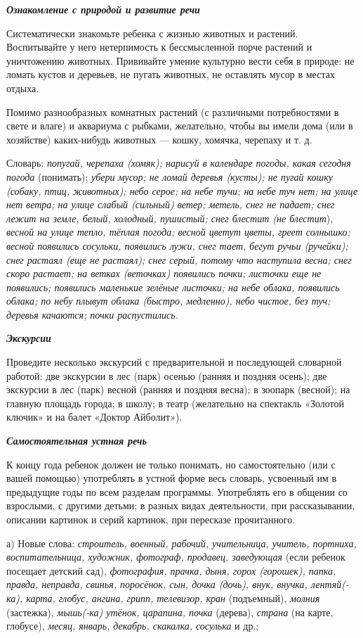 \documentclass[a5paper]{book}
\renewcommand{\emph}[1]{\textit{#1}}
\begin{document}
\emph{\textbf{Ознакомление с природой и развитие речи}}

Систематически знакомьте ребенка с жизнью животных и растений.
Воспитывайте у него нетерпимость к бессмысленной порче растений и
уничтожению животных. Прививайте умение культурно вести себя в природе:
не ломать кустов и деревьев, не пугать животных, не оставлять мусор в
местах отдыха.

Помимо разнообразных комнатных растений (с различными потребностями в
свете и влаге) и аквариума с рыбками, желательно, чтобы вы имели дома
(или в хозяйстве) каких-нибудь животных --- кошку, хомячка, черепаху и
т. д.

Словарь: \emph{попугай, черепаха (хомяк); нарисуй в календаре погоды,
какая сегодня погода} (понимать); \emph{убери мусор; не ломай деревья
(кусты); не пугай кошку (собаку, птиц, животных); небо серое; на небе
тучи; на небе туч нет; на улице нет ветра; на улице слабый (сильный)
ветер; метель, снег не падает; снег лежит на земле, белый, холодный,
пушистый; снег блестит (не блестит}), \emph{весной на улице тепло,
тёплая погода; весной цветут цветы, греет солнышко; весной появились
сосульки, появились лужи, снег тает, бегут ручьи (ручейки); снег растаял
(еще не растаял); снег серый, потому что наступила весна; снег скоро
растает; на ветках (веточках) появились почки; листочки еще не
появились; появились маленькие зелёные листочки; на небе облака,
появились облака; по небу плывут облака (быстро, медленно), небо чистое,
без туч; деревья качаются; почки распустились.}

\emph{\textbf{Экскурсии}}

Проведите несколько экскурсий с предварительной и последующей словарной
работой: две экскурсии в лес (парк) осенью (ранняя и поздняя осень); две
экскурсии в лес (парк) весной (ранняя и поздняя весна); в зоопарк
(весной); на главную площадь города; в школу; в театр (желательно на
спектакль «Золотой ключик» и на балет «Доктор Айболит»).

\emph{\textbf{Самостоятельная устная речь}}

К концу года ребенок должен не только понимать, но самостоятельно (или с
вашей помощью) употреблять в устной форме весь словарь, усвоенный им в
предыдущие годы по всем разделам программы. Употреблять его в общении со
взрослыми, с другими детьми; в разных видах деятельности, при
рассказывании, описании картинок и серий картинок, при пересказе
прочитанного.

а) Новые слова: \emph{строитель, военный, рабочий, учительница, учитель,
портниха, воспитательница, художник, фотограф, продавец, заведующая}
(если ребенок посещает детский сад), \emph{фотография, прачка, дыня,
горох (горошек), папка, правда, неправда, свинья, поросёнок, сын, дочка
(дочь), внук, внучка, лентяй(-ка), карта, глобус, ангина, грипп,
телевизор, кран} (подъемный), \emph{молния} (застежка), \emph{мышь(-ка)
утёнок, царапина, почка} (дерева), \emph{страна} (на карте, глобусе),
\emph{месяц, январь, декабрь, скакалка, сосулька} и др.;
\end{document}
